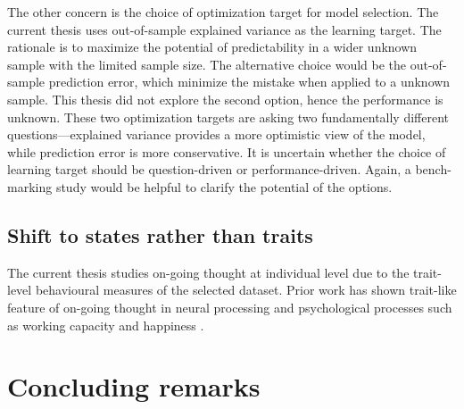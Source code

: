 The other concern is the choice of optimization target for model selection. The current thesis uses out-of-sample explained variance as the learning target. The rationale is to maximize the potential of predictability in a wider unknown sample with the limited sample size. The alternative choice would be the out-of-sample prediction error, which minimize the mistake when applied to a unknown sample. This thesis did not explore the second option, hence the performance is unknown. These two optimization targets are asking two fundamentally different questions---explained variance provides a more optimistic view of the model, while prediction error is more conservative. It is uncertain whether the choice of learning target should be question-driven or performance-driven. Again, a bench-marking study would be helpful to clarify the potential of the options. 

\subsection{Shift to states rather than traits}

The current thesis studies on-going thought at individual level due to the trait-level behavioural measures of the selected dataset. Prior work has shown trait-like feature of on-going thought in neural processing \cite{Smallwood2016} and psychological processes such as working capacity \cite{McVay2009} and happiness \cite{Ruby2013}. 
%
%
%


\section{Concluding remarks}
\label{ch:discussion:summary}
